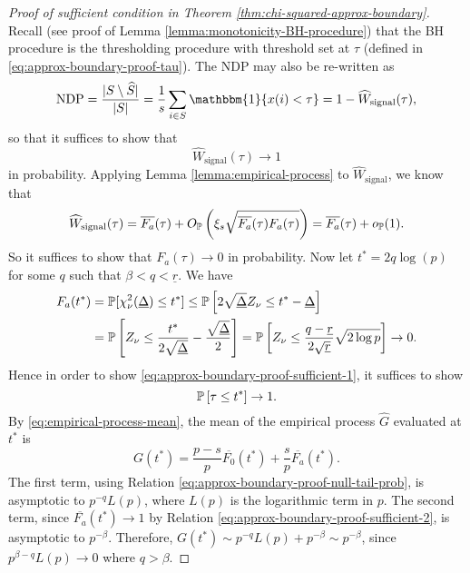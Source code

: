 \begin{proof}[Proof of sufficient condition in Theorem \ref{thm:chi-squared-approx-boundary}]
Recall (see proof of Lemma \ref{lemma:monotonicity-BH-procedure}) that the BH procedure is the thresholding procedure with threshold set at $\tau$ (defined in \eqref{eq:approx-boundary-proof-tau}).
The NDP may also be re-written as 
$$
\text{NDP} = \frac{|{S}\setminus\widehat{S}|}{|{S}|} = \frac{1}{s}\sum_{i\in S}\mathbbm{1}\{x(i) < \tau\} = 1 - \widehat{W}_\text{signal}(\tau),
$$
so that it suffices to show that 
\begin{equation} \label{eq:approx-boundary-proof-sufficient-1}
    \widehat{W}_\text{signal}(\tau)\to 1
\end{equation} in probability.
Applying Lemma \ref{lemma:empirical-process} to $\widehat{W}_\text{signal}$, we know that 
$$
\widehat{W}_\text{signal}(\tau) = \overline{F_a}(\tau) + O_\P\left(\xi_s\sqrt{\overline{F_a}(\tau)F_a(\tau)}\right) = \overline{F_a}(\tau) + o_\P(1).
$$
So it suffices to show that $F_a(\tau)\to 0$ in probability.
Now let $t^* = 2q\log(p)$ for some $q$ such that $\beta<q<\underline{r}$.
We have 
\begin{align}
    F_a(t^*) 
    &= \P[\chi^2_\nu(\underline{\Delta}) \le t^*]
    \le \P\left[2\sqrt{\underline{\Delta}}Z_\nu \le t^* - \underline{\Delta}\right] \nonumber \\
    &= \P\left[Z_\nu \le \frac{t^*}{2\sqrt{\underline{\Delta}}} - \frac{\sqrt{\underline{\Delta}}}{2}\right] 
    = \P\left[Z_\nu \le \frac{q-\underline{r}}{2\sqrt{\underline{r}}}\sqrt{2\log{p}}\right] \to 0. \label{eq:approx-boundary-proof-sufficient-2}
\end{align} 
Hence in order to show \eqref{eq:approx-boundary-proof-sufficient-1}, it suffices to show 
\begin{equation} \label{eq:approx-boundary-proof-sufficient-3}
    \P\left[\tau \le t^*\right] \to 1.
\end{equation}
By \eqref{eq:empirical-process-mean}, the mean of the empirical process $\widehat{G}$ evaluated at $t^*$ is
\begin{equation*}
    G(t^*) = \frac{p-s}{p}\overline{F_0}(t^*) + \frac{s}{p}\overline{F_a}(t^*).
\end{equation*}
The first term, using Relation \eqref{eq:approx-boundary-proof-null-tail-prob}, is asymptotic to $p^{-q}L(p)$, where $L(p)$ is the logarithmic term in $p$.
The second term, since $\overline{F_a}(t^*)\to 1$ by Relation \eqref{eq:approx-boundary-proof-sufficient-2}, is asymptotic to $p^{-\beta}$.
Therefore, $G(t^*) \sim p^{-q}L(p) + p^{-\beta} \sim p^{-\beta}$, since 
$p^{\beta-q}L(p)\to0$ where $q>\beta$.


\end{proof}

